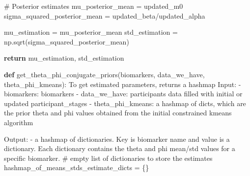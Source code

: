 \documentclass[
  letterpaper,
  DIV=11,
  numbers=noendperiod]{scrreprt}
\newenvironment{Shaded}{\begin{snugshade}}{\end{snugshade}}
\newcommand{\CommentTok}[1]{\textcolor[rgb]{0.37,0.37,0.37}{#1}}
\newcommand{\ControlFlowTok}[1]{\textcolor[rgb]{0.00,0.23,0.31}{\textbf{#1}}}
\newcommand{\KeywordTok}[1]{\textcolor[rgb]{0.00,0.23,0.31}{\textbf{#1}}}
\newcommand{\NormalTok}[1]{\textcolor[rgb]{0.00,0.23,0.31}{#1}}
\newcommand{\OperatorTok}[1]{\textcolor[rgb]{0.37,0.37,0.37}{#1}}
\begin{document}
\begin{Shaded}
\begin{Highlighting}[]
    \CommentTok{\# Posterior estimates}
\NormalTok{    mu\_posterior\_mean }\OperatorTok{=}\NormalTok{ updated\_m0}
\NormalTok{    sigma\_squared\_posterior\_mean }\OperatorTok{=}\NormalTok{ updated\_beta}\OperatorTok{/}\NormalTok{updated\_alpha}

\NormalTok{    mu\_estimation }\OperatorTok{=}\NormalTok{ mu\_posterior\_mean}
\NormalTok{    std\_estimation }\OperatorTok{=}\NormalTok{ np.sqrt(sigma\_squared\_posterior\_mean)}

    \ControlFlowTok{return}\NormalTok{ mu\_estimation, std\_estimation}

\KeywordTok{def}\NormalTok{ get\_theta\_phi\_conjugate\_priors(biomarkers, data\_we\_have, theta\_phi\_kmeans):}
    \CommentTok{\textquotesingle{}\textquotesingle{}\textquotesingle{}To get estimated parameters, returns a hashmap}
\CommentTok{    Input:}
\CommentTok{    {-} biomarkers: biomarkers }
\CommentTok{    {-} data\_we\_have: participants data filled with initial or updated participant\_stages}
\CommentTok{    {-} theta\_phi\_kmeans: a hashmap of dicts, which are the prior theta and phi values}
\CommentTok{        obtained from the initial constrained kmeans algorithm}

\CommentTok{    Output: }
\CommentTok{    {-} a hashmap of dictionaries. Key is biomarker name and value is a dictionary.}
\CommentTok{    Each dictionary contains the theta and phi mean/std values for a specific biomarker. }
\CommentTok{    \textquotesingle{}\textquotesingle{}\textquotesingle{}}
    \CommentTok{\# empty list of dictionaries to store the estimates}
\NormalTok{    hashmap\_of\_means\_stds\_estimate\_dicts }\OperatorTok{=}\NormalTok{ \{\}}


\end{Highlighting}
\end{Shaded}
\end{document}
